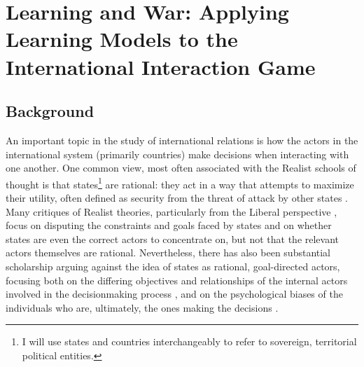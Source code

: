 \chapter[Learning and War]{Learning and War: Applying Learning Models to the International Interaction Game}

\section{Background}\label{background}

An important topic in the study of international relations is how the actors in the international system (primarily countries) make decisions when interacting with one another. One common view, most often associated with the Realist schools of thought \citep{sep_2013} is that states\footnote{I will use states and countries interchangeably to refer to sovereign, territorial political entities.} are rational: they act in a way that attempts to maximize their utility, often defined as security from the threat of attack by other states \citep{keohane_1986}. Many critiques of Realist theories, particularly from the Liberal perspective \citep[e.g.][]{keohane_1987}, focus on disputing the constraints and goals faced by states and on whether states are even the correct actors to concentrate on, but not that the relevant actors themselves are rational. Nevertheless, there has also been substantial scholarship arguing against the idea of states as rational, goal-directed actors, focusing both on the differing objectives and relationships of the internal actors involved in the decisionmaking process \citep{singer_1961,wendt_1987,allison_1999}, and on the psychological biases of the individuals who are, ultimately, the ones making the decisions \citep{north_1967,jervis_1976,khong_1992,kaufmann_1994}.

